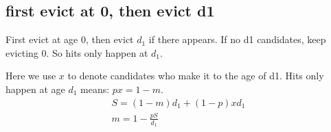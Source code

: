 \documentclass[12pt, letterpaper]{article}
\begin{document}
\subsection{first evict at 0, then evict d1}
First evict at age 0, then evict $d_1$ if there appears. If no d1 candidates,
keep evicting 0. So hits only happen at $d_1$.

Here we use $x$ to denote candidates who make it to the age of d1. Hits only
happen at age $d_1$ means: $px = 1-m$.
\begin{equation}
\begin{gathered}
S = (1-m) d_1 + (1-p) x d_1 \\
m = 1 - \frac{pS}{d_1}
\end{gathered}
\end{equation}
\end{document}
